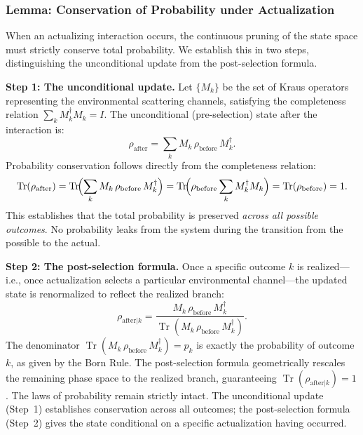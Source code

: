 \documentclass[11pt,a4paper]{article}
\theoremstyle{plain}
\theoremstyle{definition}
\theoremstyle{remark}
\begin{document}
\subsubsection{Lemma: Conservation of Probability under Actualization}

When an actualizing interaction occurs, the continuous pruning of the state space
must strictly conserve total probability. We establish this in two steps,
distinguishing the unconditional update from the post-selection formula.

\textbf{Step 1: The unconditional update.} Let $\{M_k\}$ be the set of Kraus
operators representing the environmental scattering channels, satisfying the
completeness relation $\sum_k M_k^{\dagger}M_k = I$. The unconditional
(pre-selection) state after the interaction is:
\begin{equation}
  \rho_{\mathrm{after}} = \sum_k M_k\,\rho_{\mathrm{before}}\,M_k^{\dagger}.
\end{equation}
Probability conservation follows directly from the completeness relation:
\begin{equation}
  \operatorname{Tr}(\rho_{\mathrm{after}})
  = \operatorname{Tr}\!\Bigl(\sum_k M_k\,\rho_{\mathrm{before}}\,M_k^{\dagger}\Bigr)
  = \operatorname{Tr}\!\Bigl(\rho_{\mathrm{before}}\sum_k M_k^{\dagger}M_k\Bigr)
  = \operatorname{Tr}(\rho_{\mathrm{before}})
  = 1.
\end{equation}
This establishes that the total probability is preserved \emph{across all possible
outcomes}. No probability leaks from the system during the transition from the
possible to the actual.

\textbf{Step 2: The post-selection formula.} Once a specific outcome $k$ is
realized---i.e., once actualization selects a particular environmental
channel---the updated state is renormalized to reflect the realized branch:
\begin{equation}
  \rho_{\mathrm{after}|k}
  = \frac{M_k\,\rho_{\mathrm{before}}\,M_k^{\dagger}}
         {\operatorname{Tr}(M_k\,\rho_{\mathrm{before}}\,M_k^{\dagger})}.
\end{equation}
The denominator $\operatorname{Tr}(M_k\,\rho_{\mathrm{before}}\,M_k^{\dagger}) =
p_k$ is exactly the probability of outcome $k$, as given by the Born Rule. The
post-selection formula geometrically rescales the remaining phase space to the
realized branch, guaranteeing $\operatorname{Tr}(\rho_{\mathrm{after}|k}) = 1$.
The laws of probability remain strictly intact. The unconditional update (Step~1)
establishes conservation across all outcomes; the post-selection formula (Step~2)
gives the state conditional on a specific actualization having occurred.
\end{document}
